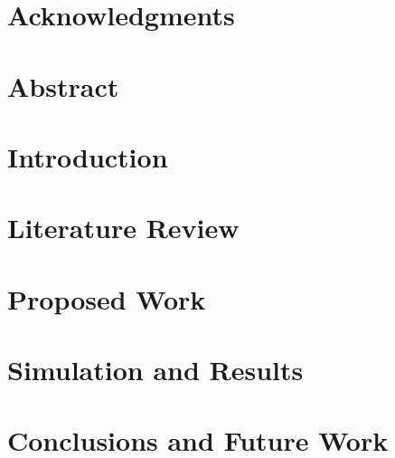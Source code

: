 \documentclass[a4paper, 11pt, oneside]{Dissertation}
\begin{document}
\sloppy
{}








\chapter*{Acknowledgments}
\label{ch:ack}


\chapter*{Abstract}
\label{ch:ack}




\pagestyle{fancy}
\tableofcontents
\newpage

\mainmatter	  

\chapter{Introduction}
\label{ch:intro}


\chapter{Literature Review}
\label{ch:literature}


\chapter{Proposed Work}
\label{ch:new}


\chapter{Simulation and Results}
\label{ch:result}


\chapter{Conclusions and Future Work}
\label{ch:conclude}


\newpage
{}
\small{{}}

\end{document}
